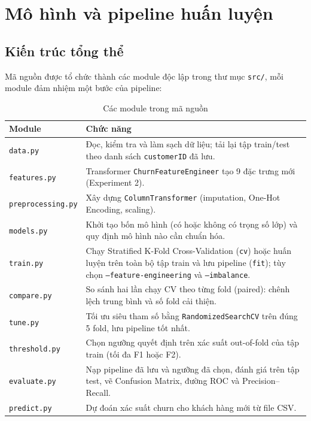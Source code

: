 \section{Mô hình và pipeline huấn luyện}

\subsection{Kiến trúc tổng thể}
Mã nguồn được tổ chức thành các module độc lập trong thư mục \texttt{src/}, mỗi module đảm nhiệm một bước của pipeline:

\begin{table}[H]
\centering
\begin{tabular}{l p{11.5cm}}
\toprule
\textbf{Module} & \textbf{Chức năng} \\
\midrule
\texttt{data.py} & Đọc, kiểm tra và làm sạch dữ liệu; tải lại tập train/test theo danh sách \texttt{customerID} đã lưu. \\
\texttt{features.py} & Transformer \texttt{ChurnFeatureEngineer} tạo 9 đặc trưng mới (Experiment 2). \\
\texttt{preprocessing.py} & Xây dựng \texttt{ColumnTransformer} (imputation, One-Hot Encoding, scaling). \\
\texttt{models.py} & Khởi tạo bốn mô hình (có hoặc không có trọng số lớp) và quy định mô hình nào cần chuẩn hóa. \\
\texttt{train.py} & Chạy Stratified K-Fold Cross-Validation (\texttt{cv}) hoặc huấn luyện trên toàn bộ tập train và lưu pipeline (\texttt{fit}); tùy chọn \texttt{--feature-engineering} và \texttt{--imbalance}. \\
\texttt{compare.py} & So sánh hai lần chạy CV theo từng fold (paired): chênh lệch trung bình và số fold cải thiện. \\
\texttt{tune.py} & Tối ưu siêu tham số bằng \texttt{RandomizedSearchCV} trên đúng 5 fold, lưu pipeline tốt nhất. \\
\texttt{threshold.py} & Chọn ngưỡng quyết định trên xác suất out-of-fold của tập train (tối đa F1 hoặc F2). \\
\texttt{evaluate.py} & Nạp pipeline đã lưu và ngưỡng đã chọn, đánh giá trên tập test, vẽ Confusion Matrix, đường ROC và Precision--Recall. \\
\texttt{predict.py} & Dự đoán xác suất churn cho khách hàng mới từ file CSV. \\
\bottomrule
\end{tabular}
\caption{Các module trong mã nguồn}
\end{table}

